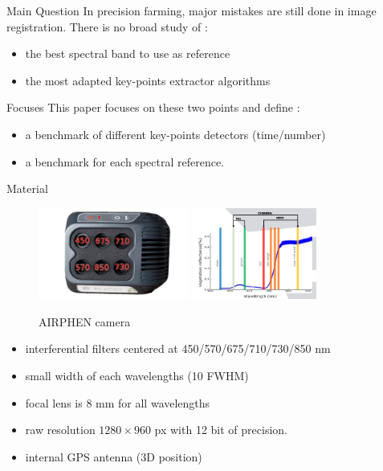 \documentclass{beamer}
\begin{document}
		\begin{frame}{Main Question}
			In precision farming, major mistakes are still done in image registration.
			There is no broad study of :
			
			\begin{itemize}
				\item the best spectral band to use as reference
				\item the most adapted key-points extractor algorithms
			\end{itemize}
		\end{frame}
	
		\begin{frame}{Focuses}
			This paper focuses on these two points and define :
			\begin{itemize}
				\item a benchmark of different key-points detectors (time/number)
				\item a benchmark for each spectral reference.
			\end{itemize}
		\end{frame}
	
		\begin{frame}{Material}
			\begin{figure}
				\centering
				\includegraphics[height=3cm]{../figures/airphen-detail4.png}
				\includegraphics[height=3cm]{wavelengths.png}
				\caption{AIRPHEN camera}
			\end{figure}
			\begin{itemize}
				\item interferential filters centered at {\small 450/570/675/710/730/850 nm}
				\item small width of each wavelengths (10 FWHM)
				\item focal lens is 8 mm for all wavelengths
				\item raw resolution $1280 \times 960$ px with 12 bit of precision.
				\item internal GPS antenna (3D position)
			\end{itemize}
		\end{frame}
	
\end{document}
